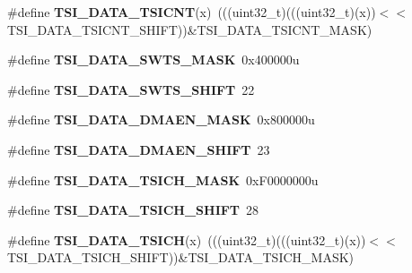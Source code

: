 \begin{DoxyCompactItemize}
\#define {\bfseries T\+S\+I\+\_\+\+D\+A\+T\+A\+\_\+\+T\+S\+I\+C\+NT}(x)~(((uint32\+\_\+t)(((uint32\+\_\+t)(x))$<$$<$T\+S\+I\+\_\+\+D\+A\+T\+A\+\_\+\+T\+S\+I\+C\+N\+T\+\_\+\+S\+H\+I\+FT))\&T\+S\+I\+\_\+\+D\+A\+T\+A\+\_\+\+T\+S\+I\+C\+N\+T\+\_\+\+M\+A\+SK)
\item 
\mbox{\label{group___t_s_i___register___masks_ga4b533f08277dec51d70c9bf4a536f9e5}} 
\#define {\bfseries T\+S\+I\+\_\+\+D\+A\+T\+A\+\_\+\+S\+W\+T\+S\+\_\+\+M\+A\+SK}~0x400000u
\item 
\mbox{\label{group___t_s_i___register___masks_ga1e6460b9202aeb655c0a0f678b716526}} 
\#define {\bfseries T\+S\+I\+\_\+\+D\+A\+T\+A\+\_\+\+S\+W\+T\+S\+\_\+\+S\+H\+I\+FT}~22
\item 
\mbox{\label{group___t_s_i___register___masks_gab6346bdfb0f86f39a0e22bf63724e2b6}} 
\#define {\bfseries T\+S\+I\+\_\+\+D\+A\+T\+A\+\_\+\+D\+M\+A\+E\+N\+\_\+\+M\+A\+SK}~0x800000u
\item 
\mbox{\label{group___t_s_i___register___masks_gab90f8f124f3b09590815173156ddc149}} 
\#define {\bfseries T\+S\+I\+\_\+\+D\+A\+T\+A\+\_\+\+D\+M\+A\+E\+N\+\_\+\+S\+H\+I\+FT}~23
\item 
\mbox{\label{group___t_s_i___register___masks_ga4e8ebbde2df6b54d7056eb509d23dcf6}} 
\#define {\bfseries T\+S\+I\+\_\+\+D\+A\+T\+A\+\_\+\+T\+S\+I\+C\+H\+\_\+\+M\+A\+SK}~0x\+F0000000u
\item 
\mbox{\label{group___t_s_i___register___masks_ga93e49d0e44e5be77fbf39e45d5b9b9f0}} 
\#define {\bfseries T\+S\+I\+\_\+\+D\+A\+T\+A\+\_\+\+T\+S\+I\+C\+H\+\_\+\+S\+H\+I\+FT}~28
\item 
\mbox{\label{group___t_s_i___register___masks_gabc816a3e5aa6be2b683ae4ca3d72e793}} 
\#define {\bfseries T\+S\+I\+\_\+\+D\+A\+T\+A\+\_\+\+T\+S\+I\+CH}(x)~(((uint32\+\_\+t)(((uint32\+\_\+t)(x))$<$$<$T\+S\+I\+\_\+\+D\+A\+T\+A\+\_\+\+T\+S\+I\+C\+H\+\_\+\+S\+H\+I\+FT))\&T\+S\+I\+\_\+\+D\+A\+T\+A\+\_\+\+T\+S\+I\+C\+H\+\_\+\+M\+A\+SK)
\item 
\mbox{\label{group___t_s_i___register___masks_ga9b69d87b18f8791e9b8d97d67b3bc6d7}} 

\end{DoxyCompactItemize}
